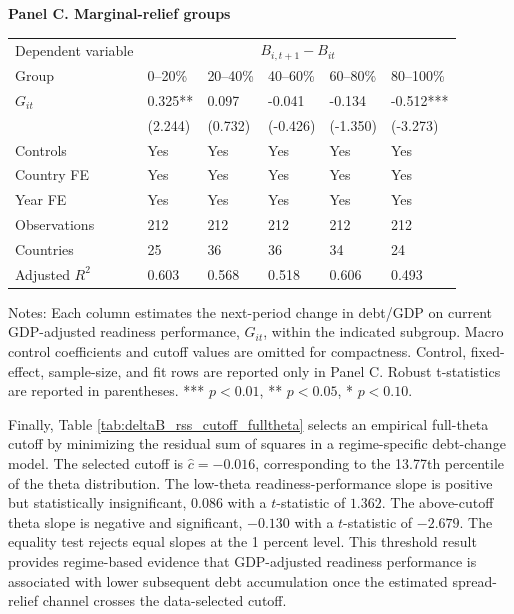 \documentclass[11pt]{article}
\theoremstyle{definition}
\begin{document}
\begin{table}[H]
\begin{threeparttable}
\vspace{0.75em}
\textbf{Panel C. Marginal-relief groups}\\[0.45em]
\begin{tabularx}{\textwidth}{lYYYYY}
\toprule
Dependent variable &  \\
\cmidrule(lr){2-6}
Group & 0--20\% & 20--40\% & 40--60\% & 60--80\% & 80--100\% \\
\midrule
$G_{it}$ & 0.325** & 0.097 & -0.041 & -0.134 & -0.512*** \\
 & (2.244) & (0.732) & (-0.426) & (-1.350) & (-3.273) \\
\midrule
Controls & Yes & Yes & Yes & Yes & Yes \\
Country FE & Yes & Yes & Yes & Yes & Yes \\
Year FE & Yes & Yes & Yes & Yes & Yes \\
Observations & 212 & 212 & 212 & 212 & 212 \\
Countries & 25 & 36 & 36 & 34 & 24 \\
Adjusted $R^2$ & 0.603 & 0.568 & 0.518 & 0.606 & 0.493 \\
\bottomrule
\end{tabularx}
\begin{tablenotes}[flushleft]\footnotesize
\item Notes: Each column estimates the next-period change in debt/GDP on current GDP-adjusted readiness performance, $G_{it}$, within the indicated subgroup. Macro control coefficients and cutoff values are omitted for compactness. Control, fixed-effect, sample-size, and fit rows are reported only in Panel C. Robust t-statistics are reported in parentheses. *** $p<0.01$, ** $p<0.05$, * $p<0.10$.
\end{tablenotes}
\end{threeparttable}
\end{table}

Finally, Table \ref{tab:deltaB_rss_cutoff_fulltheta} selects an empirical full-theta cutoff by minimizing the residual sum of squares in a regime-specific debt-change model. The selected cutoff is $\widehat{c}=-0.016$, corresponding to the 13.77th percentile of the theta distribution. The low-theta readiness-performance slope is positive but statistically insignificant, $0.086$ with a $t$-statistic of $1.362$. The above-cutoff theta slope is negative and significant, $-0.130$ with a $t$-statistic of $-2.679$. The equality test rejects equal slopes at the 1 percent level. This threshold result provides regime-based evidence that GDP-adjusted readiness performance is associated with lower subsequent debt accumulation once the estimated spread-relief channel crosses the data-selected cutoff.
\end{document}
